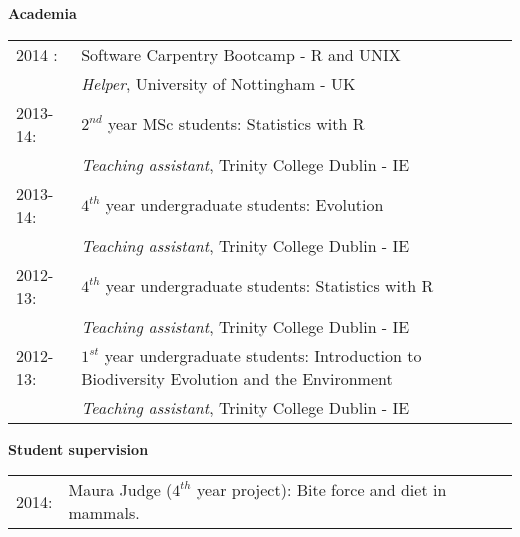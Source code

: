\documentclass[10pt,a4paper]{article}
\begin{document}
{\raggedright\textbf{Academia}\\[1.5ex]
\begin{tabular}{ll}
2014 : & Software Carpentry Bootcamp - R and UNIX \\
& \textit{Helper}, University of Nottingham - UK \\
2013-14: & $2^{nd}$ year MSc students: Statistics with R \\
& \textit{Teaching assistant}, Trinity College Dublin - IE \\
2013-14: & $4^{th}$ year undergraduate students: Evolution\\
& \textit{Teaching assistant}, Trinity College Dublin - IE\\
2012-13: & $4^{th}$ year undergraduate students: Statistics with R\\
& \textit{Teaching assistant}, Trinity College Dublin - IE\\
2012-13: & $1^{st}$ year undergraduate students: Introduction to Biodiversity Evolution and the Environment\\
& \textit{Teaching assistant}, Trinity College Dublin - IE\\
\end{tabular}
\raggedright\textbf{Student supervision}\\[1.5ex]
\begin{tabular}{ll}
2014: & Maura Judge ($4^{th}$ year project): Bite force and diet in mammals. \\
\end{tabular}
\bigskip

}
\end{document}
